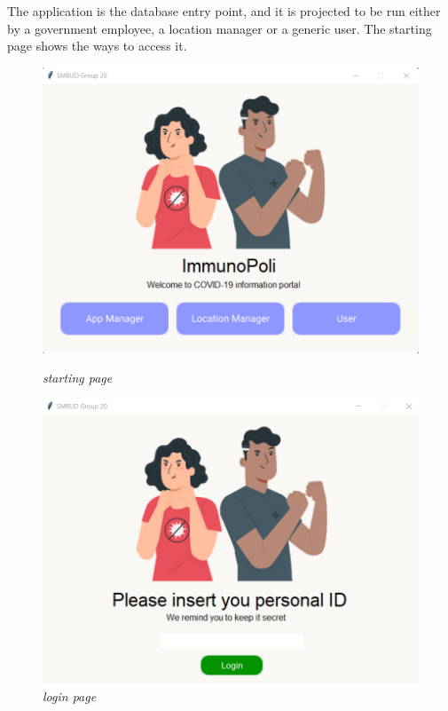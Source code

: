 The application is the database entry point, and it is projected to be run either by a government employee, a location manager or a generic user. The starting page shows the ways to access it.
\begin{figure}[h]
    \centering
    \begin{minipage}{0.75\textwidth}
        \centering
        \includegraphics[width=\textwidth]{images/starting_page.png} 
        \caption{\textit{starting page}}
        \label{figure 2}
    \end{minipage}\hfill
    \begin{minipage}{0.75\textwidth}
        \centering
        \includegraphics[width=\textwidth]{images/login_page.png} 
        \caption{\textit{login page}}
        \label{figure 3}
    \end{minipage}
\end{figure}

